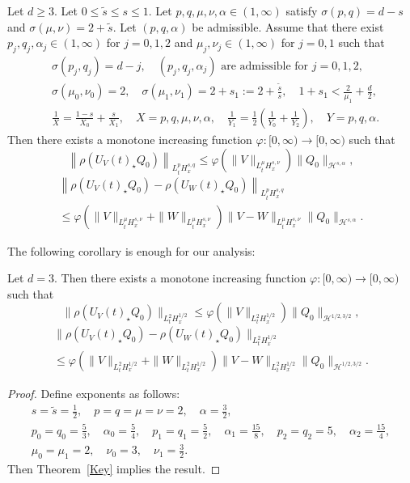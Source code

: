 \documentclass[10pt,a4paper]{amsart}
\newcommand{\CH}{\mathcal{H}}
\newcommand{\al}{\alpha}
\newcommand{\ph}{\varphi}
\newcommand{\si}{\sigma}
\newcommand{\rh}{\rho}
\newcommand{\wt}{\widetilde}
\newcommand{\K}[1]{\left(#1\right)}
\newcommand{\I}{\infty}
\newcommand{\st}{\star}
\newcommand{\tw}{\frac{1}{2}}
\begin{document}
\begin{theo}\label{Key}
Let $d \ge 3$. Let $0 \le \wt{s} \le s \le 1$. Let $p,q,\mu,\nu,\al \in (1,\I)$ satisfy $\si(p,q)=d-s$ and $\si(\mu,\nu) = 2+\wt{s}$. Let $(p,q,\al)$ be admissible. Assume that there exist $p_j,q_j,\al_j \in (1,\I)$ for $j=0,1,2$ and $\mu_j,\nu_j \in (1,\I)$ for $j=0,1$ such that
\begin{align}
&\si(p_j,q_j) = d-j,\quad (p_j,q_j,\al_j) \text{ are admissible for } j=0,1,2, \\
&\si(\mu_0,\nu_0) = 2, \quad \si (\mu_1,\nu_1) = 2+s_1 := 2 + \frac{\wt{s}}{s}, \quad 1+s_1 < \frac{2}{\mu_1}+\frac{d}{2},\\
&\frac{1}{X} = \frac{1-s}{X_0} + \frac{s}{X_1}, \quad X = p,q,\mu,\nu,\al,
\quad \frac{1}{Y_1} = \frac{1}{2} \K{\frac{1}{Y_0} + \frac{1}{Y_2}}, \quad Y=p,q,\al.
\end{align}
Then there exists a monotone increasing function $\ph:[0,\I) \to [0,\I)$ such that
\begin{equation}\label{g stri}
\left\|\rh(U_V(t)_\st Q_0)\right\|_{L^p_t H^{s,q}_x}
\le \ph(\|V\|_{L^{\mu}_t H^{s,\nu}_x})
\|Q_0\|_{\CH^{s,\al}}, 
\end{equation}
\begin{multline}\label{diff g stri}
\left\|\rh(U_V(t)_\st Q_0) - \rh(U_W(t)_\st Q_0)\right\|_{L^p_t H^{s,q}_x} \\
\le \ph\left(\|V\|_{L^{\mu}_t H^{s,\nu}_x} + \|W\|_{L^{\mu}_t H^{s,\nu}_x}\right)
\|V-W\|_{L^\mu_t H^{s,\nu}_x}
\|Q_0\|_{\CH^{s,\al}}. 
\end{multline}
\end{theo}

The following corollary is enough for our analysis:

\begin{coro} \label{key cor}
Let $d=3$. Then there exists a monotone increasing function $\ph:[0,\I) \to [0,\I)$ such that
\begin{equation}
\|\rh(U_V(t)_\st Q_0) \|_{L^2_t H^{1/2}_x} \le \ph\left(\|V\|_{L^2_t H^{1/2}_x}\right) \|Q_0\|_{\CH^{1/2,3/2}},
\end{equation}
\begin{multline}
\big\|\rh(U_V(t)_\st Q_0) - \rh(U_W(t)_\st Q_0)\big\|_{L^2_t H^{1/2}_x} \\
 \le \ph\left(\|V\|_{L^2_t H^{1/2}_x} + \|W\|_{L^2_t H^{1/2}_x}\right)
\|V-W\|_{L^2_t H^{1/2}_x}
\|Q_0\|_{\CH^{1/2,3/2}}.
\end{multline}
\end{coro}
\begin{proof}
Define exponents as follows:
\begin{gather}
s =\wt{s}=\tw, \quad p=q=\mu=\nu=2, \quad \al=\frac{3}{2}, \\
p_0 = q_0 = \frac{5}{3}, \quad \al_0 = \frac{5}{4},
\quad p_1=q_1=\frac{5}{2}, \quad \al_1 = \frac{15}{8},
\quad p_2=q_2=5, \quad \al_2=\frac{15}{4}, \\
\mu_0 = \mu_1=2, \quad \nu_0 = 3, \quad \nu_1 = \frac{3}{2}.
\end{gather}
Then Theorem~\ref{Key} implies the result.
\end{proof}
\end{document}
